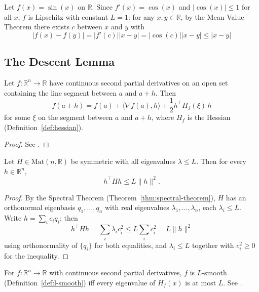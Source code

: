 		\begin{example}
			\label{ex:sin-lipschitz}
			Let $f(x) = \sin(x)$ on $\mathbb{R}$. Since $f'(x) = \cos(x)$ and $|\cos(x)| \le 1$ for all $x$, $f$ is Lipschitz with constant $L=1$: for any $x,y\in\mathbb{R}$, by the Mean Value Theorem \citep{Rudin1976} there exists $c$ between $x$ and $y$ with
			\[
				|f(x)-f(y)| = |f'(c)||x-y| = |\cos(c)||x-y| \le |x-y|
			\]
		\end{example}
		
	\subsection{The Descent Lemma}
		
		\begin{theorem}
			\label{thm:taylor-multivariate}
			Let $f:\mathbb{R}^n\to\mathbb{R}$ have continuous second partial derivatives on an open set containing the line segment between $a$ and $a+h$. Then
			\[
				f(a+h) = f(a) + \langle \nabla f(a), h \rangle + \frac{1}{2} h^\top H_f(\xi)\, h
			\]
			for some $\xi$ on the segment between $a$ and $a+h$, where $H_f$ is the Hessian (Definition~\ref{def:hessian}).
		\end{theorem}
		
		\begin{proof}
			See \cite[\S9.8]{Rudin1976}.
		\end{proof}
		
		\begin{proposition}
			\label{prop:hessian-bound}
			Let $H \in \mathrm{Mat}(n,\mathbb{R})$ be symmetric with all eigenvalues $\lambda \le L$. Then for every $h\in\mathbb{R}^n$,
			\[
				h^\top H h \le L\|h\|^2.
			\]
		\end{proposition}
		
		\begin{proof}
			By the Spectral Theorem (Theorem~\ref{thm:spectral-theorem}), $H$ has an orthonormal eigenbasis $q_1,\dots,q_n$ with real eigenvalues $\lambda_1,\dots,\lambda_n$, each $\lambda_i \le L$. Write $h = \sum_i c_iq_i$; then
			\[
				h^\top H h = \sum_i \lambda_ic_i^2 \le L\sum_i c_i^2 = L\|h\|^2
			\]
			using orthonormality of $\{q_i\}$ for both equalities, and $\lambda_i \le L$ together with $c_i^2\ge0$ for the inequality.
		\end{proof}
		
		\begin{remark}
			\label{rem:l-smooth-hessian-equivalence}
			For $f:\mathbb{R}^n\to\mathbb{R}$ with continuous second partial derivatives, $f$ is $L$-smooth (Definition~\ref{def:l-smooth}) iff every eigenvalue of $H_f(x)$ is at most $L$. See \cite[\S9.1]{BoydVandenberghe2004}.
		\end{remark}
		
